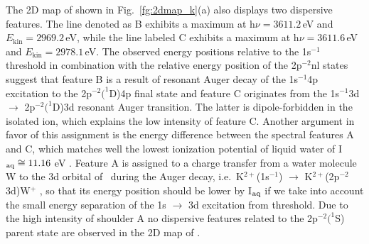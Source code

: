 
{\color{blue} The 2D map of \ki shown in Fig.\ \ref{fg:2dmap_k}(a) also displays two dispersive features. The line denoted as B exhibits a maximum at h$\nu = 3611.2$\,eV and $E_{\text{kin}} = 2969.2$\,eV, while the line labeled C exhibits a maximum at h$\nu = 3611.6$\,eV and $E_{\text{kin}} = 2978.1$\,eV. The observed energy positions relative to the \ki 1s$^{-1}$ threshold in combination with the relative energy position of the 2p$^{-2}$nl states suggest that feature B is a result of resonant Auger decay of the 1s$^{-1}$4p excitation to the 2p$^{-2}(^1$D)4p final state and feature C originates from the 1s$^{-1}$3d $\rightarrow$ 2p$^{-2}(^1$D)3d resonant Auger transition. The latter is dipole-forbidden in the isolated ion, which explains the low intensity of feature C. %
Another argument in favor of this assignment is the energy difference between the spectral features A and C, which matches well the lowest ionization potential of liquid water of I$_{\rm aq} \cong 11.16$ eV \cite{winter04:2625}. Feature A is assigned to a charge transfer from a water molecule W to the 3d orbital of \ki~during the Auger decay, i.e.\ K$^{2+}$(1s$^{-1}$) $\rightarrow$ K$^{2+}$(2p$^{-2}$3d)W$^{+}$ \citep{ceolin17:263003}, so that its energy position should be lower by I$_{\rm aq}$ if we take into account the small energy separation of the 1s $\rightarrow$ 3d excitation from threshold. Due to the high intensity of shoulder A no dispersive features related to the 2p$^{-2}(^1$S) parent state are observed in the 2D map of \ki.} 








